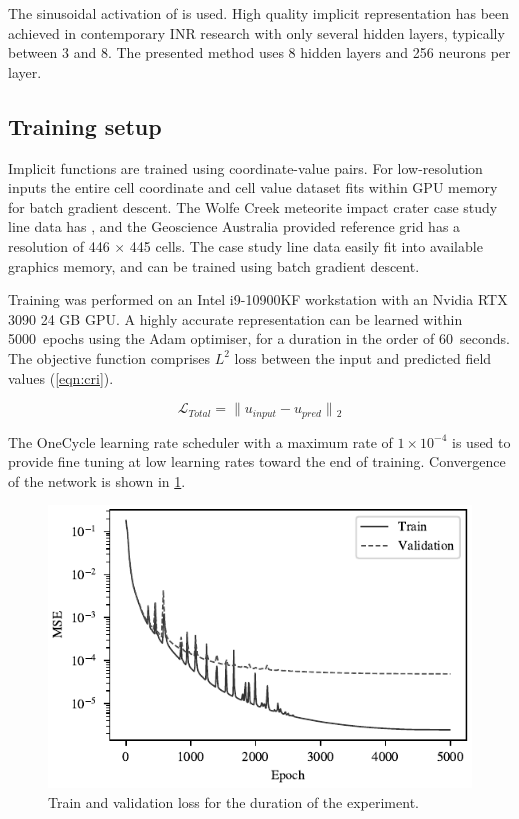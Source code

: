 \documentclass[manuscript.tex]{subfiles}
\begin{document}
The sinusoidal activation of \cite{sitzmann2019siren} is used.
High quality implicit representation has been achieved in contemporary INR research with only several hidden layers, typically between 3 and 8.
The presented method uses 8 hidden layers and 256 neurons per layer.

\subsection{Training setup}
\label{sec:training}

Implicit functions are trained using coordinate-value pairs.
For low-resolution inputs the entire cell coordinate and cell value dataset fits within GPU memory for batch gradient descent.
The Wolfe Creek meteorite impact crater case study line data has , and the Geoscience Australia provided reference grid has a resolution of 446 \(\times{}\) 445 cells.
The case study line data easily fit into available graphics memory, and can be trained using batch gradient descent.

Training was performed on an Intel i9-10900KF workstation with an Nvidia RTX 3090 24 GB GPU\@.
A highly accurate representation can be learned within \SI{5000}{epochs} using the Adam optimiser, for a duration in the order of \SI{60}{seconds}.
The objective function comprises \(L^2\) loss between the input and predicted field values (\cref{eqn:cri}).

\begin{equation}
    \label{eqn:cri}
    \mathcal{L}_{Total} = \lVert{}u_{input} - u_{pred}\rVert{}_{2} %
\end{equation}

The OneCycle learning rate scheduler \parencite{smithSuperconvergenceVeryFast2018} with a maximum rate of \(1\times{}10^{-4}\) is used to provide fine tuning at low learning rates toward the end of training.
Convergence of the network is shown in \cref{fig:convergence}.


\begin{figure}[hbt]
    \centering{}
    \includegraphics[width=0.5\linewidth]{fig/p3/loss_plot.pdf}
    \caption[Training convergence]{Train and validation loss for the duration of the experiment.}
    \label{fig:convergence}
\end{figure}
\end{document}
